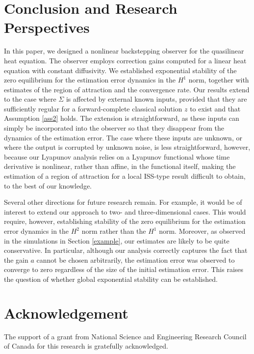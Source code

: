 \documentclass[twocolumn]{autart}
\begin{document}
\section{Conclusion and Research Perspectives}\label{sec_conclusion}
In this paper, we designed a nonlinear backstepping observer for the quasilinear heat equation. The observer employs correction gains computed for a linear heat equation with constant diffusivity. We established exponential stability of the zero equilibrium for the estimation error dynamics in the $H^1$ norm, together with estimates of the region of attraction and the convergence rate. Our results extend to the case where $\Sigma$ is affected by external known inputs, provided that they are sufficiently regular for a forward-complete classical solution $z$ to exist and that Assumption \ref{ass2} holds. The extension is straightforward, as these inputs can simply be incorporated into the observer so that they disappear from the dynamics of the estimation error. The case where these inputs are unknown, or where the output is corrupted by unknown noise, is less straightforward, however, because our Lyapunov analysis relies on a Lyapunov functional whose time derivative is nonlinear, rather than affine, in the functional itself, making the estimation of a region of attraction for a local ISS-type result difficult to obtain, to the best of our knowledge.

Several other directions for future research remain. For example, it would be of interest to extend our approach to two- and three-dimensional cases. This would require, however, establishing stability of the zero equilibrium for the estimation error dynamics in the $H^2$ norm rather than the $H^1$ norm. Moreover, as observed in the simulations in Section \ref{example}, our estimates are likely to be quite conservative. In particular, although our analysis correctly captures the fact that the gain $a$ cannot be chosen arbitrarily, the estimation error was observed to converge to zero regardless of the size of the initial estimation error. This raises the question of whether global exponential stability can be established. 

\section{Acknowledgement}
The support of a grant from National Science and Engineering Research Council of Canada for this research is gratefully acknowledged.

\end{document}
